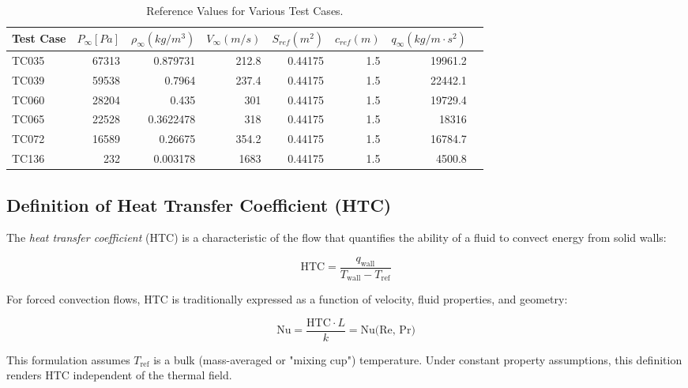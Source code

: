 \documentclass[12pt]{article}
\begin{document}
\begin{table}[H]
\centering
\caption{Reference Values for Various Test Cases.}
\label{tab:combined-reference-values}
\begin{tabular}{l|rrrrrrr}
\toprule
\textbf{Test Case} & $P_{\infty} [Pa]$ & $\rho_{\infty} (kg/m^3)$ & $V_{\infty} (m/s)$ & $S_{ref} (m^2)$ & $c_{ref} (m)$ & $q_{\infty} (kg/m \cdot s^2)$ \\
\midrule
TC035 & 67313 & 0.879731    & 212.8       & 0.44175 & 1.5 & 19961.2 \\
TC039 & 59538 & 0.7964      & 237.4       & 0.44175 & 1.5 & 22442.1 \\
TC060 & 28204 & 0.435       & 301         & 0.44175 & 1.5 & 19729.4 \\
TC065 & 22528 & 0.3622478   & 318         & 0.44175 & 1.5 & 18316 \\
TC072 & 16589 & 0.26675     & 354.2       & 0.44175 & 1.5 & 16784.7 \\
TC136 & 232 & 0.003178    & 1683        & 0.44175 & 1.5 & 4500.8 \\
\bottomrule
\end{tabular}
\end{table}

\subsection{Definition of Heat Transfer Coefficient (HTC)}

The \textit{heat transfer coefficient} (HTC) is a characteristic of the flow that quantifies the ability of a fluid to convect energy from solid walls:

$$
\text{HTC} = \frac{q_{\text{wall}}}{T_{\text{wall}} - T_{\text{ref}}}
$$

For forced convection flows, HTC is traditionally expressed as a function of velocity, fluid properties, and geometry:

$$
\text{Nu} = \frac{\text{HTC} \cdot L}{k} = \text{Nu(Re, Pr)}
$$

This formulation assumes $ T_{\text{ref}} $ is a bulk (mass-averaged or "mixing cup") temperature. Under constant property assumptions, this definition renders HTC independent of the thermal field.
\end{document}
